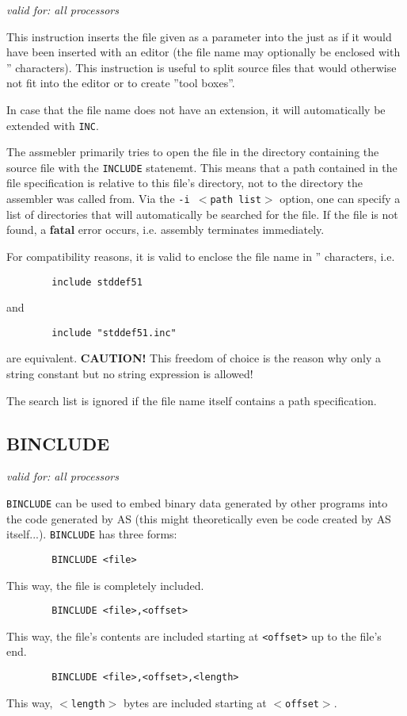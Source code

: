 \documentclass[12pt,twoside]{report}
\makeatletter
\newcommand{\bb}[1]{{\bf #1}}
\newcommand{\tty}[1]{{\tt #1}}
\newcommand{\ttindex}[1]{\index{#1@{\tt #1}}}
\newcommand{\asname}{{AS}}
\makeatother
\begin{document}
{\em valid for: all processors}

This instruction inserts the file given as a parameter into the just as
if it would have been inserted with an editor (the file name may
optionally be enclosed with '' characters).  This instruction is
useful to split source files that would otherwise not fit into the
editor or to create ''tool boxes''.

In case that the file name does not have an extension, it will
automatically be extended with \tty{INC}.

The assmebler primarily tries to open the file in the directory
containing the source file with the \tty{INCLUDE} statenemt.  This
means that a path contained in the file specification is relative
to this file's directory, not to the directory the assembler was
called from.  Via the \tty{-i $<$path list$>$} option, one can
specify a list of directories that will automatically be searched
for the file.  If the file is not found, a \bb{fatal} error occurs,
i.e. assembly terminates immediately.

For compatibility reasons, it is valid to enclose the file name in ''
characters, i.e.
\begin{verbatim}
        include stddef51
\end{verbatim}
and
\begin{verbatim}
        include "stddef51.inc"
\end{verbatim}
are equivalent.  \bb{CAUTION!} This freedom of choice is the reason why
only a string constant but no string expression is allowed!

The search list is ignored if the file name itself contains a path
specification.


\subsection{BINCLUDE}
\ttindex{BINCLUDE}

{\em valid for: all processors}

\tty{BINCLUDE} can be used to embed binary data generated by other programs
into the code generated by \asname{} (this might theoretically even be code
created by \asname{} itself...).  \tty{BINCLUDE} has three forms:
\begin{verbatim}
        BINCLUDE <file>
\end{verbatim}
This way, the file is completely included.
\begin{verbatim}
        BINCLUDE <file>,<offset>
\end{verbatim}
This way, the file's contents are included starting at \tty{<offset>} up to
the file's end.
\begin{verbatim}
        BINCLUDE <file>,<offset>,<length>
\end{verbatim}
This way, \tty{$<$length$>$} bytes are included starting at
\tty{$<$offset$>$}.
\end{document}
